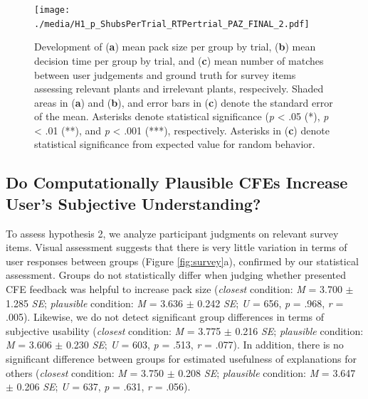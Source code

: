 \begin{figure}
   \centering
   \texttt{[image: ./media/H1\_p\_ShubsPerTrial\_RTPertrial\_PAZ\_FINAL\_2.pdf]}
   \caption{Development of (\textbf{a}) mean pack size per group by trial, (\textbf{b}) mean decision time per group by trial, and (\textbf{c}) mean number of matches between user judgements and ground truth for survey items assessing relevant plants and irrelevant plants, respecively. Shaded areas in (\textbf{a}) and (\textbf{b}), and error bars in (\textbf{c}) denote the standard error of the mean. Asterisks denote statistical significance (\textit{p} < .05 (*), \textit{p} < .01 (**), and \textit{p} < .001 (***), respectively. Asterisks in (\textbf{c}) denote statistical significance from expected value for random behavior.}
   \label{fig:hyp1}
 \end{figure}

\subsection{Do Computationally Plausible CFEs Increase User's Subjective Understanding?}
To assess hypothesis 2, we analyze participant judgments on relevant survey items.
Visual assessment suggests that there is very little variation in terms of user responses between groups (Figure \ref{fig:survey}a), confirmed by our statistical assessment. 
Groups do not statistically differ when judging whether presented \gls{CFE} feedback was helpful to increase pack size (\textit{closest} condition: \textit{M} = 3.700 $\pm$ 1.285 \textit{SE}; \textit{plausible} condition: \textit{M} = 3.636 $\pm$ 0.242 \textit{SE}; \textit{U} = 656, \textit{p} = .968, \textit{r} = .005).
Likewise, we do not detect significant group differences in terms of subjective usability (\textit{closest} condition: \textit{M} = 3.775 $\pm$ 0.216 \textit{SE}; \textit{plausible} condition: \textit{M} = 3.606 $\pm$ 0.230 \textit{SE}; \textit{U} = 603, \textit{p} = .513, \textit{r} = .077).
In addition, there is no significant difference between groups for estimated usefulness of explanations for others (\textit{closest} condition: \textit{M} = 3.750 $\pm$ 0.208 \textit{SE}; \textit{plausible} condition: \textit{M} = 3.647 $\pm$ 0.206 \textit{SE}; \textit{U} = 637, \textit{p} = .631, \textit{r} = .056).

